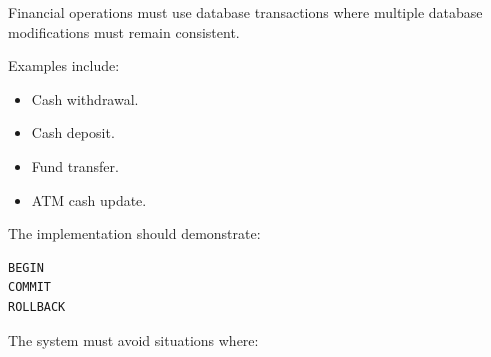 \documentclass[12pt,a4paper]{article}
\begin{document}
Financial operations must use database transactions where multiple
database modifications must remain consistent.

Examples include:

\begin{itemize}
    \item Cash withdrawal.
    \item Cash deposit.
    \item Fund transfer.
    \item ATM cash update.
\end{itemize}

The implementation should demonstrate:

\begin{verbatim}
BEGIN
COMMIT
ROLLBACK
\end{verbatim}

The system must avoid situations where:
\end{document}
